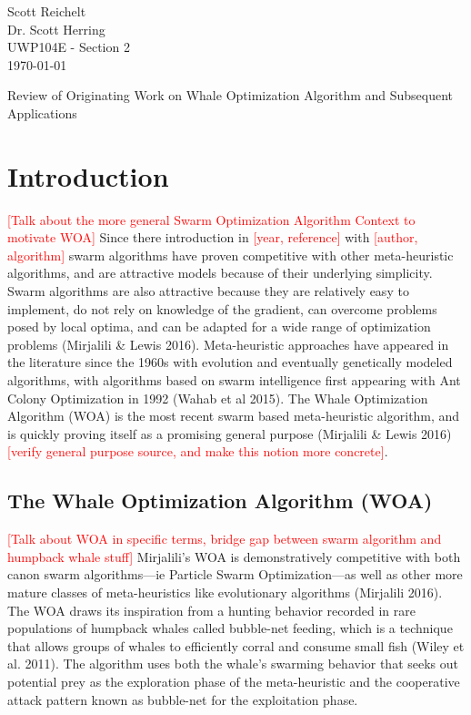 \documentclass[11pt]{article}
\newcommand{\TODO}[1]{\textcolor{red}{[#1]}}
\begin{document}
    \thispagestyle{empty}
    \begin{flushleft}
        Scott Reichelt\\
        Dr. Scott Herring\\
        UWP104E - Section 2\\
        \today\\
    \end{flushleft}
    \vspace{1em}
    \begin{center}
        Review of Originating Work on Whale Optimization Algorithm and Subsequent Applications
    \end{center}

\section*{Introduction}
\TODO{Talk about the more general Swarm Optimization Algorithm Context to motivate WOA}
Since there introduction in \TODO{year, reference} with \TODO{author, algorithm} swarm algorithms have proven competitive with other meta-heuristic algorithms, and are attractive models because of their underlying simplicity.
Swarm algorithms are also attractive because they are relatively easy to implement, do not rely on knowledge of the gradient, can overcome problems posed by local optima, and can be adapted for a wide range of optimization problems (Mirjalili \& Lewis 2016).
Meta-heuristic approaches have appeared in the literature since the 1960s with evolution and eventually genetically modeled algorithms, with algorithms based on swarm intelligence first appearing with Ant Colony Optimization in 1992 (Wahab et al 2015).
The Whale Optimization Algorithm (WOA) is the most recent swarm based meta-heuristic algorithm, and is quickly proving itself as a promising general purpose (Mirjalili \& Lewis 2016) \TODO{verify general purpose source, and make this notion more concrete}.

\subsection*{The Whale Optimization Algorithm (WOA)}
\TODO{Talk about WOA in specific terms, bridge gap between swarm algorithm and humpback whale stuff}
Mirjalili's WOA is demonstratively competitive with both canon swarm algorithms---ie Particle Swarm Optimization---as well as other more mature classes of meta-heuristics like evolutionary algorithms (Mirjalili 2016).
The WOA draws its inspiration from a hunting behavior recorded in rare populations of humpback whales called bubble-net feeding, which is a technique that allows groups of whales to efficiently corral and consume small fish (Wiley et al. 2011).
The algorithm uses both the whale's swarming behavior that seeks out potential prey as the exploration phase of the meta-heuristic and the cooperative attack pattern known as bubble-net for the exploitation phase.
\end{document}
